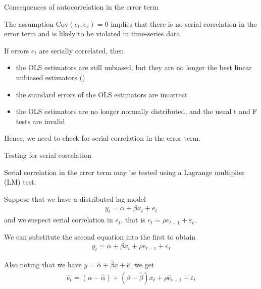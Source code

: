 \documentclass[10pt,aspectratio=169]{beamer}  %
\begin{document}
\begin{frame}{Consequences of autocorrelation in the error term}

    \bigskip
    The assumption $ \mathrm{Cov}(e_{t}, e_{s}) = 0 $ implies that there is no serial correlation in the error term and is likely to be violated in time-series data.

    \medskip
    If errors $ e_{t} $ are serially correlated, then
    \begin{itemize}\itemsep=1em
        \item the OLS estimators are still unbiased, but they are no longer the best linear unbiased estimators ()
        \item the standard errors of the OLS estimators are incorrect
        \item the OLS estimators are no longer normally distributed, and the usual t and F tests are invalid
    \end{itemize}

    \medskip
    Hence, we need to check for serial correlation in the error term.

\end{frame}


\begin{frame}{Testing for serial correlation}

    \bigskip
    Serial correlation in the error term may be tested using a Lagrange multiplier (LM) test.

    \medskip
    Suppose that we have a distributed lag model
    \begin{align*}
        y_{t} = \alpha + \beta x_{t} + e_{t}
    \end{align*}
    and we suspect serial correlation in $ e_{t} $, that is $ e_{t} = \rho e_{t-1} + \varepsilon_{t} $.

    \medskip
    We can substitute the second equation into the first to obtain
    \begin{align*}
        y_{t} = \alpha + \beta x_{t} + \rho e_{t-1} + \varepsilon_{t}
    \end{align*}

    Also noting that we have $ y = \widehat{\alpha} + \widehat{\beta} x + \widehat{e} $, we get
    \begin{align*}
        \widehat{e}_{t} = \left( \alpha - \widehat{\alpha} \right) + \left( \beta - \widehat{\beta} \right) x_{t} + \rho \widehat{e}_{t-1} + \varepsilon_{t}
    \end{align*}

\end{frame}
\end{document}
